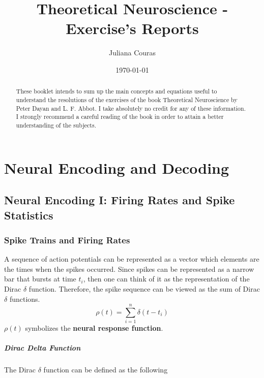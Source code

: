 \documentclass{report}
\title{Theoretical Neuroscience - Exercise's Reports}
\author{Juliana Couras}
\date{\today}
\begin{document}
\maketitle
\tableofcontents
\begin{abstract}
These booklet intends to sum up the main concepts and equations useful to understand the resolutions of the exercises of the book Theoretical Neuroscience by Peter Dayan and L. F. Abbot. I take absolutely no credit for any of these information. I strongly recommend a careful reading of the book in order to attain a better understanding of the subjects. 
\end{abstract}
\chapter{Neural Encoding and Decoding}
\section{Neural Encoding I: Firing Rates and Spike Statistics}
\subsection{Spike Trains and Firing Rates}

A sequence of action potentials can be represented as a vector which elements are the times when the spikes occurred. Since spikes can be represented as a narrow bar that bursts at time $t_{i}$, then one can think of it as the representation of the Dirac $\delta$ function. Therefore, the spike sequence can be viewed as the sum of Dirac $\delta$ functions. 
\begin{equation}
\rho(t) = \sum_{i=1}^{n} \delta(t-t_{i})
\end{equation}
$\rho(t)$ symbolizes the \textbf{neural response function}.
\\\paragraph{Dirac Delta Function}
The Dirac $\delta$ function can be defined as the following
\end{document}
